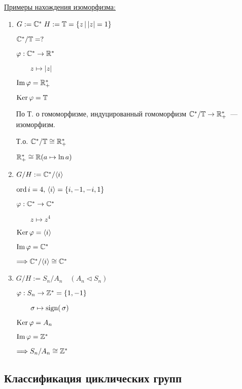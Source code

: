\underline{Примеры нахождения изоморфизма:}
\begin{enumerate}
    \item $G := \mathbb{C}^* \; H := \mathbb{T} = \{ z \, | \, |z| = 1 \}$
    
    $\mathbb{C}^* / \mathbb{T} = ?$ 

    $\varphi: \mathbb{C}^* \to \mathbb{R}^{*}$

    $\quad \quad z \mapsto |z|$

    $\operatorname{Im} \varphi = \mathbb{R}^{*}_{+}$

    $\operatorname{Ker} \varphi = \mathbb{T}$

    По Т. о гомоморфизме, индуцированный гомоморфизм $\mathbb{C}^{*} / \mathbb{T} \to \mathbb{R}^{*}_{+}$~--- изоморфизм.

    Т.о. $\mathbb{C}^* / \mathbb{T} \cong \mathbb{R}^{*}_+$

    \notice $\mathbb{R}^{*}_+ \cong \mathbb{R} (a \mapsto \ln{a})$

    \item $G / H := \mathbb{C}^* / \langle i \rangle$
    
    $\operatorname{ord} i = 4, \, \langle i \rangle = \{ i, -1, -i, 1 \}$
    
    $\varphi: \mathbb{C}^* \to \mathbb{C}^*$
    
    $\quad \quad z \mapsto z^4$

    $\operatorname{Ker} \varphi = \langle i \rangle$

    $\operatorname{Im} \varphi = \mathbb{C}^*$

    $\Longrightarrow \mathbb{C}^* / \langle i \rangle \cong \mathbb{C}^*$

    \item $G / H := S_n / A_n \quad (A_n \vartriangleleft S_n)$
    
    $\varphi: S_n \to \mathbb{Z}^* = \{ 1, -1 \}$

    $\quad \quad \sigma \mapsto \operatorname{sign (}\sigma)$

    $\operatorname{Ker} \varphi = A_n$

    $\operatorname{Im} \varphi = \mathbb{Z}^*$

    $\Longrightarrow S_n / A_n \cong \mathbb{Z}^{*}$
\end{enumerate}

\subsection{Классификация циклических групп}

